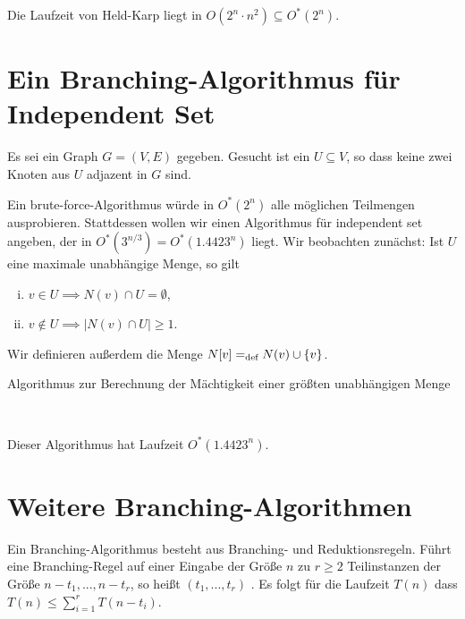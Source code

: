   Die Laufzeit von Held-Karp liegt in \(O(2^n \cdot n^2) \subseteq O^*(2^n)\). 

\section{Ein Branching-Algorithmus für Independent Set}

  Es sei ein Graph \(G = (V,E)\) gegeben. Gesucht ist ein \(U \subseteq V\), so dass keine zwei Knoten aus \(U\) adjazent in \(G\) sind.

  Ein brute-force-Algorithmus würde in \(O^*(2^n)\) alle möglichen Teilmengen ausprobieren. Stattdessen wollen wir einen Algorithmus für independent set angeben, der in \(O^*(3^{n/3}) = O^*(1.4423^n)\) liegt. Wir beobachten zunächst: Ist \(U\) eine maximale unabhängige Menge, so gilt

  \begin{enumerate}[(i)]
   \item \(v \in U \implies N(v) \cap U = \emptyset\),
   \item \(v \notin U \implies |N(v) \cap U| \geq 1\).
  \end{enumerate}

  Wir definieren außerdem die Menge \(N[v] =_\text{def} N(v) \cup \{v\}\).

  \begin{algorithm}[H]
    \caption{Algorithmus zur Berechnung der Mächtigkeit einer größten unabhängigen Menge}

     \\

  \end{algorithm}

  Dieser Algorithmus hat Laufzeit \(O^*(1.4423^n)\).

\section{Weitere Branching-Algorithmen}

  Ein Branching-Algorithmus besteht aus Branching- und Reduktionsregeln. Führt eine Branching-Regel auf einer Eingabe der Größe \(n\) zu \(r \geq 2\) Teilinstanzen der Größe \(n - t_1, ..., n - t_r\), so heißt \( (t_1,...,t_r) \) . Es folgt für die Laufzeit \(T(n)\) dass \(T(n) \leq \sum_{i=1}^r T(n-t_i)\).

